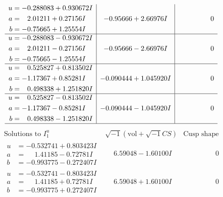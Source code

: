 \documentclass[1p]{elsarticle_modified}
\theoremstyle{definition}
\newcommand{\I}{\sqrt{-1}}
\begin{document}
$$\begin{array}{c|c|c}
\begin{aligned}
u &= -0.288083 + 0.930672 I \\
a &= \phantom{-}2.01211 + 0.27156 I \\
b &= -0.75665 + 1.25554 I\end{aligned}
 & -0.95666 + 2.66976 I & \phantom{-0.000000 } 0 \\ \hline\begin{aligned}
u &= -0.288083 - 0.930672 I \\
a &= \phantom{-}2.01211 - 0.27156 I \\
b &= -0.75665 - 1.25554 I\end{aligned}
 & -0.95666 - 2.66976 I & \phantom{-0.000000 } 0 \\ \hline\begin{aligned}
u &= \phantom{-}0.525827 + 0.813502 I \\
a &= -1.17367 + 0.85281 I \\
b &= \phantom{-}0.498338 + 1.251820 I\end{aligned}
 & -0.090444 + 1.045920 I & \phantom{-0.000000 } 0 \\ \hline\begin{aligned}
u &= \phantom{-}0.525827 - 0.813502 I \\
a &= -1.17367 - 0.85281 I \\
b &= \phantom{-}0.498338 - 1.251820 I\end{aligned}
 & -0.090444 - 1.045920 I & \phantom{-0.000000 } 0\\
 \hline 
 \end{array}$$\newpage$$\begin{array}{c|c|c}  
\text{Solutions to }I^u_{1}& \I (\text{vol} + \sqrt{-1}CS) & \text{Cusp shape}\\
 \hline 
\begin{aligned}
u &= -0.532741 + 0.803423 I \\
a &= \phantom{-}1.41185 - 0.72781 I \\
b &= -0.993775 - 0.272407 I\end{aligned}
 & \phantom{-}6.59048 - 1.60100 I & \phantom{-0.000000 } 0 \\ \hline\begin{aligned}
u &= -0.532741 - 0.803423 I \\
a &= \phantom{-}1.41185 + 0.72781 I \\
b &= -0.993775 + 0.272407 I\end{aligned}
 & \phantom{-}6.59048 + 1.60100 I & \phantom{-0.000000 } 0 \\ \hline\begin{aligned}

\end{aligned}
\end{array}$$
\end{document}
